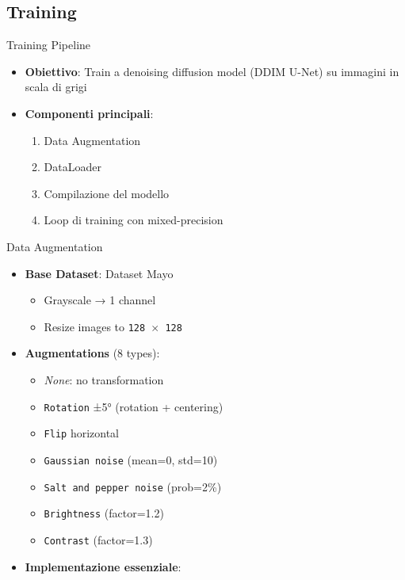 \subsection{Training}
\begin{frame}{Training Pipeline}
    \begin{itemize}
        \item \textbf{Obiettivo}: Train a denoising diffusion model (DDIM U-Net) su immagini in scala di grigi
        \item \textbf{Componenti principali}:
              \begin{enumerate}
                  \item Data Augmentation
                  \item DataLoader
                  \item Compilazione del modello
                  \item Loop di training con mixed-precision
              \end{enumerate}
    \end{itemize}
\end{frame}

\begin{frame}{Data Augmentation}
    \begin{itemize}
        \item \textbf{Base Dataset}: Dataset Mayo
              \begin{itemize}
                  \item Grayscale → 1 channel
                  \item Resize images to \texttt{128 $\times$ 128}
              \end{itemize}
        \item \textbf{Augmentations} (8 types):
              \begin{itemize}
                  \item \emph{None}: no transformation
                  \item \texttt{Rotation} ±5° (rotation + centering)
                  \item \texttt{Flip} horizontal
                  \item \texttt{Gaussian noise} (mean=0, std=10)
                  \item \texttt{Salt and pepper noise} (prob=2\%)
                  \item \texttt{Brightness} (factor=1.2)
                  \item \texttt{Contrast} (factor=1.3)
              \end{itemize}
        \item \textbf{Implementazione essenziale}:
    \end{itemize}
\end{frame}


